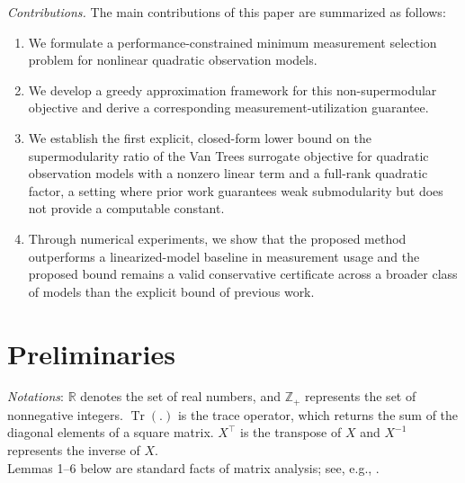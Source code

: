 \documentclass[letterpaper, 10 pt, conference]{ieeeconf}  %
\begin{document}

\textit{Contributions.} The main contributions of this paper are summarized as follows:
\begin{enumerate}
    \item We formulate a performance-constrained minimum measurement selection problem for nonlinear quadratic observation models.
    \item We develop a greedy approximation framework for this non-supermodular objective and derive a corresponding measurement-utilization guarantee.
    \item We establish the first explicit, closed-form lower bound on the supermodularity ratio of the Van Trees surrogate objective for quadratic observation models with a nonzero linear term and a full-rank quadratic factor, a setting where prior work \cite{c19} guarantees weak submodularity but does not provide a computable constant.
    \item Through numerical experiments, we show that the proposed method outperforms a linearized-model baseline in measurement usage and the proposed bound remains a valid conservative certificate across a broader class of models than the explicit bound of previous work.
\end{enumerate}


\section{Preliminaries}

\noindent \textit{Notations}: $\mathbb{R}$ denotes the set of real numbers, and $\mathbb{Z}_+$ represents the set of nonnegative integers. $\operatorname{Tr}(.)$ is the trace operator, which returns the sum of the diagonal elements of a square matrix. $X^\top$ is the transpose of $X$ and $X^{-1}$ represents the inverse of $X$. \\

Lemmas 1--6 below are standard facts of matrix analysis; see, e.g., \cite{c24}. \\
\end{document}
